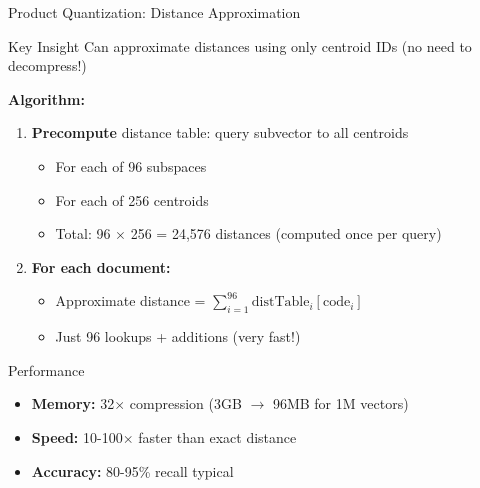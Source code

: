 \documentclass[aspectratio=169]{beamer}
\newif\ifanimated
\newcommand{\cpause}{\ifanimated\pause\fi}
\begin{document}
\begin{frame}[shrink=10]{Product Quantization: Distance Approximation}
\begin{block}{Key Insight}
Can approximate distances using only centroid IDs (no need to decompress!)
\end{block}
\cpause

\vspace{1em}

\textbf{Algorithm:}
\begin{enumerate}
    \item \textbf{Precompute} distance table: query subvector to all centroids
    \begin{itemize}
        \item For each of 96 subspaces
        \item For each of 256 centroids
        \item Total: 96 $\times$ 256 = 24,576 distances (computed once per query)
    \end{itemize}
    
    \item \textbf{For each document:}
    \begin{itemize}
        \item Approximate distance = $\sum_{i=1}^{96} \text{distTable}_i[\text{code}_i]$
        \item Just 96 lookups + additions (very fast!)
    \end{itemize}
\end{enumerate}

\vspace{1em}

\begin{exampleblock}{Performance}
\begin{itemize}
    \item \textbf{Memory:} 32$\times$ compression (3GB $\rightarrow$ 96MB for 1M vectors)
    \item \textbf{Speed:} 10-100$\times$ faster than exact distance
    \item \textbf{Accuracy:} 80-95\% recall typical
\end{itemize}
\end{exampleblock}
\cpause
\end{frame}
\end{document}
